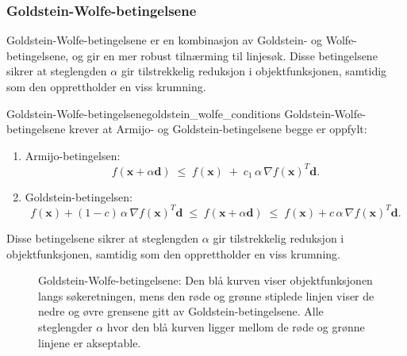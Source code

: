 \subsubsection{Goldstein-Wolfe-betingelsene}
\label{subsubsec:goldstein_wolfe_conditions}
Goldstein-Wolfe-betingelsene er en kombinasjon av Goldstein- og Wolfe-betingelsene, og gir en mer robust tilnærming til linjesøk.
Disse betingelsene sikrer at steglengden \(\alpha\) gir tilstrekkelig reduksjon i objektfunksjonen, samtidig som den opprettholder en viss krumning.
\begin{definition}{Goldstein-Wolfe-betingelsene}{goldstein_wolfe_conditions}
	Goldstein-Wolfe-betingelsene krever at Armijo- og Goldstein-betingelsene begge er oppfylt:
	\begin{enumerate}
		\item Armijo-betingelsen:
		      \[
			      f(\symbf{x} + \alpha \symbf{d})
			      \;\le\;
			      f(\symbf{x})
			      \;+\;
			      c_1\,\alpha\,\nabla f(\symbf{x})^T \symbf{d}.
		      \]
		\item Goldstein-betingelsen:
		      \[
			      f(\symbf{x}) + (1-c)\,\alpha\,\nabla f(\symbf{x})^T \symbf{d}
			      \;\le\;
			      f(\symbf{x} + \alpha \symbf{d})
			      \;\le\;
			      f(\symbf{x}) + c\,\alpha\,\nabla f(\symbf{x})^T \symbf{d}.
		      \]
	\end{enumerate}
	Disse betingelsene sikrer at steglengden \(\alpha\) gir tilstrekkelig reduksjon i objektfunksjonen, samtidig som den opprettholder en viss krumning.
\end{definition}
\begin{figure}[H]
	\centering
	\caption{Goldstein-Wolfe-betingelsene: Den blå kurven viser objektfunksjonen langs søkeretningen, mens den røde og grønne stiplede linjen viser de nedre og øvre grensene gitt av Goldstein-betingelsene. Alle steglengder $\alpha$ hvor den blå kurven ligger mellom de røde og grønne linjene er akseptable.}
	\label{fig:goldstein_wolfe_conditions}
\end{figure}


